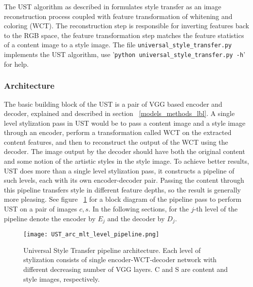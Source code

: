 The UST algorithm as described in \cite{bib11} formulates style transfer as an image reconstruction process coupled with feature transformation of whitening and coloring (WCT). The reconstruction step is responsible for inverting features back to the RGB space, the feature transformation step matches the feature statistics of a content image to a style image. The file \texttt{universal\_style\_transfer.py} implements the UST algorithm, use '\texttt{python universal\_style\_transfer.py -h}' for help.

\subsubsection{Architecture}\label{subsec:arch}
The basic building block of the UST is a pair of VGG based encoder and decoder, explained and described in section ~\ref{models_methods_lbl}. A single level stylization pass in UST would be to pass a content image and a style image through an encoder, perform a transformation called WCT on the extracted content features, and then to reconstruct the output of the WCT using the decoder. The image output by the decoder should have both the original content and some notion of the artistic styles in the style image. To achieve better results, UST does more than a single level stylization pass, it constructs a pipeline of such levels, each with its own encoder-decoder pair. Passing the content through this pipeline transfers style in different feature depths, so the result is generally more pleasing. See figure ~\ref{fig:full-pipeline} for a block diagram of the pipeline pass to perform UST on a pair of images $c,s$. In the following sections, for the $j$-th level of the pipeline denote the encoder by $E_j$ and the decoder by $D_j$.

\begin{figure}[h!]
	\centering
	\texttt{[image: UST\_arc\_mlt\_level\_pipeline.png]}
	\caption{Universal Style Transfer pipeline architecture. Each level of stylization consists of single encoder-WCT-decoder network with different decreasing number of VGG layers. C and S are content and style images, respectively.
	}
	\label{fig:full-pipeline}
\end{figure}

